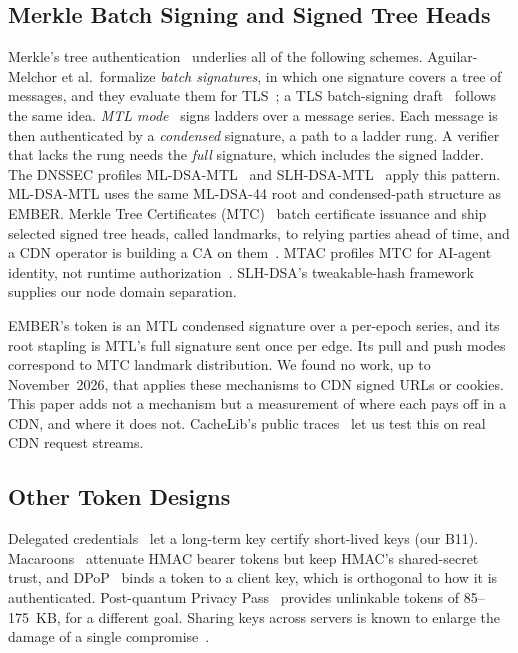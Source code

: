 \subsection{Merkle Batch Signing and Signed Tree Heads}
Merkle's tree authentication~\cite{merkle1989} underlies all of the following schemes. Aguilar-Melchor et al.\ formalize \emph{batch signatures}, in which one signature covers a tree of messages, and they evaluate them for TLS~\cite{batchsig2024}; a TLS batch-signing draft~\cite{draft-batch-signing} follows the same idea. \emph{MTL mode}~\cite{fregly2023mtl,draft-mtl-mode} signs ladders over a message series. Each message is then authenticated by a \emph{condensed} signature, a path to a ladder rung. A verifier that lacks the rung needs the \emph{full} signature, which includes the signed ladder. The DNSSEC profiles ML-DSA-MTL~\cite{draft-mldsa-mtl-dnssec} and SLH-DSA-MTL~\cite{draft-slhdsa-mtl-dnssec} apply this pattern. ML-DSA-MTL uses the same ML-DSA-44 root and condensed-path structure as EMBER. Merkle Tree Certificates (MTC)~\cite{draft-mtc,cf2025mtc} batch certificate issuance and ship selected signed tree heads, called landmarks, to relying parties ahead of time, and a CDN operator is building a CA on them~\cite{cf2026mtcca}. MTAC profiles MTC for AI-agent identity, not runtime authorization~\cite{draft-mtac}. SLH-DSA's tweakable-hash framework~\cite{sphincsplus2019} supplies our node domain separation.

EMBER's token is an MTL condensed signature over a per-epoch series, and its root stapling is MTL's full signature sent once per edge. Its pull and push modes correspond to MTC landmark distribution. We found no work, up to November~2026, that applies these mechanisms to CDN signed URLs or cookies. This paper adds not a mechanism but a measurement of where each pays off in a CDN, and where it does not. CacheLib's public traces~\cite{berg2020cachelib,cachelib-traces} let us test this on real CDN request streams.

\subsection{Other Token Designs}
Delegated credentials~\cite{rfc9345} let a long-term key certify short-lived keys (our B11). Macaroons~\cite{macaroons2014} attenuate HMAC bearer tokens but keep HMAC's shared-secret trust, and DPoP~\cite{rfc9449} binds a token to a client key, which is orthogonal to how it is authenticated. Post-quantum Privacy Pass~\cite{policharla2023pqpp} provides unlinkable tokens of 85--175~KB, for a different goal. Sharing keys across servers is known to enlarge the damage of a single compromise~\cite{springall2016shortcuts,cangialosi2016keysharing}.

